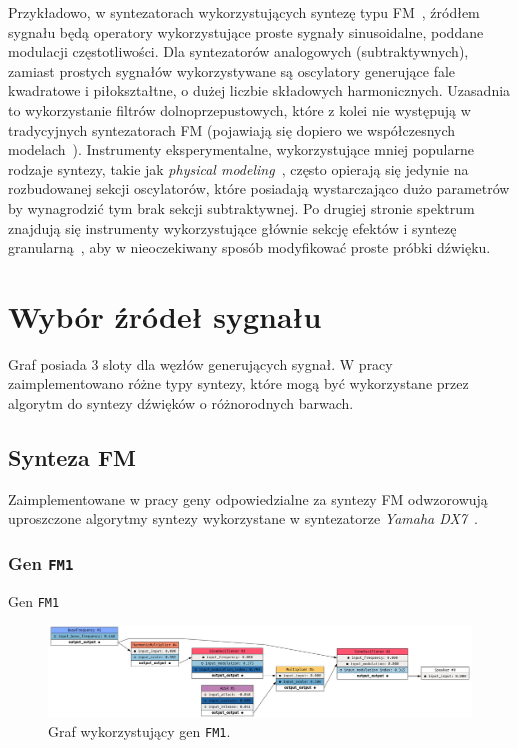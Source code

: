 Przykładowo, w syntezatorach wykorzystujących syntezę typu FM~\cite{yamaha_dx7_manual}, źródłem
sygnału będą operatory wykorzystujące proste sygnały sinusoidalne, poddane modulacji częstotliwości.
Dla syntezatorów analogowych (subtraktywnych), zamiast prostych sygnałów wykorzystywane są
oscylatory generujące fale kwadratowe i piłokształtne, o dużej liczbie składowych harmonicznych.
Uzasadnia to wykorzystanie filtrów dolnoprzepustowych, które z kolei nie występują w tradycyjnych
syntezatorach FM (pojawiają się dopiero we współczesnych modelach~\cite{digitone_manual}).
Instrumenty eksperymentalne, wykorzystujące mniej popularne rodzaje syntezy, takie jak
\textit{physical modeling}~\cite{yamaha_vl1_manual}, często opierają się jedynie na rozbudowanej
sekcji oscylatorów, które posiadają wystarczająco dużo parametrów by wynagrodzić tym brak
sekcji subtraktywnej. Po drugiej stronie spektrum znajdują się instrumenty wykorzystujące
głównie sekcję efektów i syntezę granularną~\cite{microcosm_hologram_manual},
aby w nieoczekiwany sposób modyfikować proste próbki dźwięku.

\section{Wybór źródeł sygnału}

Graf posiada 3 sloty dla węzłów generujących sygnał. W pracy zaimplementowano różne
typy syntezy, które mogą być wykorzystane przez algorytm do syntezy dźwięków o różnorodnych barwach. 

\subsection{Synteza FM}

Zaimplementowane w pracy geny odpowiedzialne za syntezy FM odwzorowują uproszczone algorytmy syntezy wykorzystane
w syntezatorze \textit{Yamaha DX7}~\cite{yamaha_dx7_manual}.

\subsubsection{Gen \texttt{FM1}}

Gen \texttt{FM1}

\begin{figure}[H]
    \centering
    \includegraphics[width=1.0\linewidth]{rys06/gene_fm1.png}
    \caption{
      Graf wykorzystujący gen \texttt{FM1}.
    }\label{fig:gene_f1}
\end{figure}



